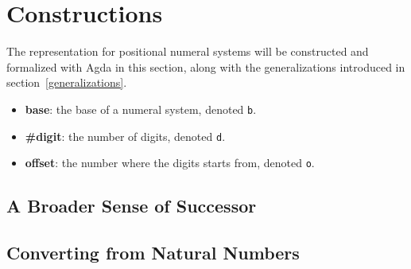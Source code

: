 \documentclass[\main/thesis.tex]{subfiles}
\begin{document}
\chapter{Constructions}\label{constructions}

The representation for positional numeral systems will be constructed and
formalized with Agda in this section,
along with the generalizations introduced in section~\ref{generalizations}.

\begin{itemize}
    \item \textbf{base}: the base of a numeral system, denoted {\lstinline|b|}.
    \item \textbf{\#digit}: the number of digits, denoted {\lstinline|d|}.
    \item \textbf{offset}: the number where the digits starts from, denoted {\lstinline|o|}.
\end{itemize}








\section{A Broader Sense of Successor}
\section{Converting from Natural Numbers}


%
%
%
\end{document}
